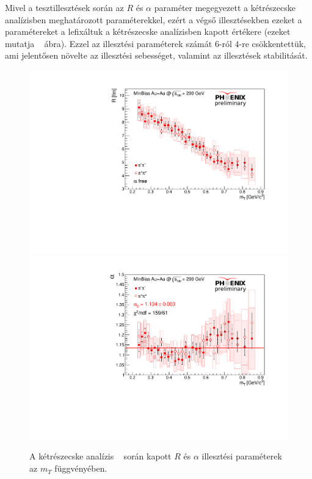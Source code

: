 \documentclass[11pt,a4paper]{article}
\numberwithin{equation}{subsection}
\numberwithin{figure}{section}
\begin{document}
Mivel a tesztillesztések során az $R$ és $\alpha$ paraméter megegyezett a kétrészecske analízisben meghatározott paraméterekkel, ezért a végső illesztésekben ezeket a paramétereket a lefixáltuk a kétrészecske analízisben kapott értékere (ezeket mutatja ~ ábra). Ezzel az illesztési paraméterek számát $6$-ról $4$-re csökkentettük, ami jelentősen növelte az illesztési sebességet, valamint az illesztések stabilitását.

\begin{figure}[H]
\centering
\includegraphics[scale=0.39]{pic/res/R_preliminary_stamp.pdf}
\includegraphics[scale=0.39]{pic/res/alpha_preliminary_stamp.pdf}
\caption{A kétrészecske analízis ~\cite{AN1244} során kapott $R$ és $\alpha$ illesztési paraméterek az $m_T$ függvényében.}
\label{fig:aR}
\end{figure}
\end{document}
